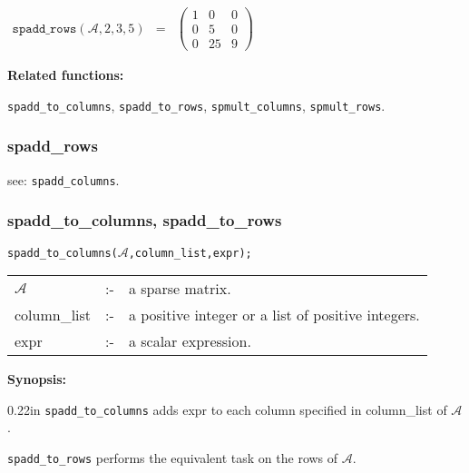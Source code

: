 \begin{flushleft}
\hspace*{0.1in}
\begin{math}
\begin{array}{ccc}
\texttt{spadd\_rows}(\mathcal{A},2,3,5) & = & 
\left( \begin{array}{ccc} 1 & 0 & 0 \\ 0 & 5 & 0 \\ 0 & 25 & 9 
\end{array} \right)  
\end{array}
\end{math}
\end{flushleft}

\textbf{Related functions:}

\hspace*{0.175in} \texttt{spadd\_to\_columns}, \texttt{spadd\_to\_rows}, 
\texttt{spmult\_columns}, \texttt{spmult\_rows}.


\subsubsection{spadd\_rows}

\hspace*{0.175in} see: \texttt{spadd\_columns}.


\subsubsection{spadd\_to\_columns, spadd\_to\_rows}

\hspace*{0.175in} \texttt{spadd\_to\_columns($\mathcal{A}$,column\_list,expr);}

\hspace*{0.1in}
\begin{tabular}{l l l}
$\mathcal{A}$   &:-& a sparse matrix. \\
column\_list &:-& a positive integer or a list of positive integers. \\
expr        &:-& a scalar expression.
\end{tabular}

\textbf{Synopsis:}

\begin{addtolength}{\leftskip}{0.22in}
\texttt{spadd\_to\_columns} adds expr to each column specified in 
column\_list of $\mathcal{A}$.  

\texttt{spadd\_to\_rows} performs the equivalent task on the rows of 
$\mathcal{A}$.

\end{addtolength}

